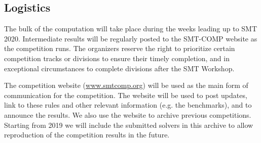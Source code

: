 \documentclass[12pt]{article}
\newcommand{\rem}[1]{\textcolor{red}{[#1]}}
\newcommand{\an}[1]{\rem{#1 -- aina}}
\begin{document}


\subsection{Logistics}
\label{sec:logistics}

%
The bulk of the computation will take place during the weeks leading
up to SMT 2020.  Intermediate results will be regularly posted to the
SMT-COMP website as the competition runs.
%
The organizers reserve the right to prioritize certain competition
tracks or divisions to ensure their timely completion, and in
exceptional circumstances to complete divisions after the SMT
Workshop.


The competition website (\url{www.smtcomp.org}) will be used as the main form
of communication for the competition. The website will be used to post updates,
link to these rules and other relevant information (e.g. the benchmarks), and
to announce the results. We also use the website to archive previous
competitions. Starting from 2019 we will include the submitted solvers in this
archive to allow reproduction of the competition results in the future.
%
\end{document}

